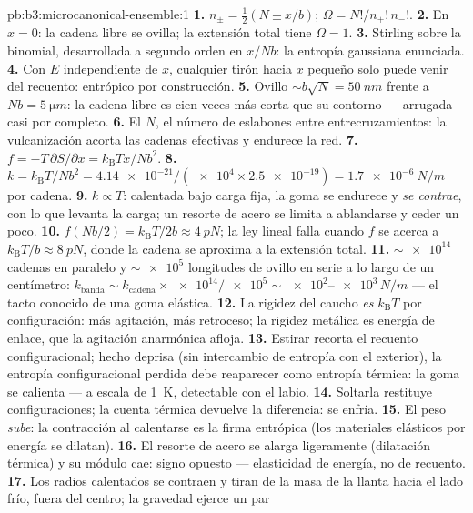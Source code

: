 \begin{solution}{pb:b3:microcanonical-ensemble:1}
\textbf{1.} $n_\pm = \tfrac12(N \pm x/b)$; $\Omega =
N!/n_+!\,n_-!$.
\textbf{2.} En $x = 0$: la cadena libre se ovilla; la extensión total tiene
$\Omega = 1$.
\textbf{3.} Stirling sobre la binomial, desarrollada a segundo orden en
$x/Nb$: la entropía gaussiana enunciada.
\textbf{4.} Con $E$ independiente de $x$, cualquier tirón hacia $x$ pequeño
solo puede venir del recuento: entrópico por construcción.
\textbf{5.} Ovillo $\sim b\sqrt N = \qty{50}{nm}$ frente a $Nb =
\qty{5}{\micro m}$: la cadena libre es cien veces más corta
que su contorno --- arrugada casi por completo.
\textbf{6.} El $N$, el número de eslabones entre entrecruzamientos: la
vulcanización acorta las cadenas efectivas y endurece la
red.
\textbf{7.} $f = -T\,\partial S/\partial x =
k_{\text{B}}Tx/Nb^2$.
\textbf{8.} $k = k_{\text{B}}T/Nb^2 = \num{4.14e-21}/(\num{e4}
\times \num{2.5e-19}) = \qty{1.7e-6}{N/m}$ por cadena.
\textbf{9.} $k \propto T$: calentada bajo carga fija, la goma se endurece y
\emph{se contrae}, con lo que levanta la carga; un resorte de acero se
limita a ablandarse y ceder un poco.
\textbf{10.} $f(Nb/2) = k_{\text{B}}T/2b \approx \qty{4}{pN}$;
la ley lineal falla cuando $f$ se acerca a $k_{\text{B}}T/b \approx
\qty{8}{pN}$, donde la cadena se aproxima a la extensión total.
\textbf{11.} $\sim\num{e14}$ cadenas en paralelo y
$\sim\num{e5}$ longitudes de ovillo en serie a lo largo de un centímetro:
$k_{\text{banda}} \sim k_{\text{cadena}} \times \num{e14}/\num{e5}
\sim \num{e2}$--$\num{e3}\,\unit{N/m}$ --- el tacto conocido de una
goma elástica.
\textbf{12.} La rigidez del caucho \emph{es} $k_{\text{B}}T$ por
configuración: más agitación, más retroceso; la rigidez metálica es
energía de enlace, que la agitación anarmónica afloja.
\textbf{13.} Estirar recorta el recuento configuracional; hecho deprisa
(sin intercambio de entropía con el exterior), la entropía configuracional
perdida debe reaparecer como entropía térmica: la goma se calienta ---
a escala de \qty{1}{K}, detectable con el labio.
\textbf{14.} Soltarla restituye configuraciones; la cuenta térmica
devuelve la diferencia: se enfría.
\textbf{15.} El peso \emph{sube}: la contracción al calentarse es
la firma entrópica (los materiales elásticos por energía se dilatan).
\textbf{16.} El resorte de acero se alarga ligeramente (dilatación
térmica) y su módulo cae: signo opuesto --- elasticidad de
energía, no de recuento.
\textbf{17.} Los radios calentados se contraen y tiran de la masa de la
llanta hacia el lado frío, fuera del centro; la gravedad ejerce un par

\end{solution}
